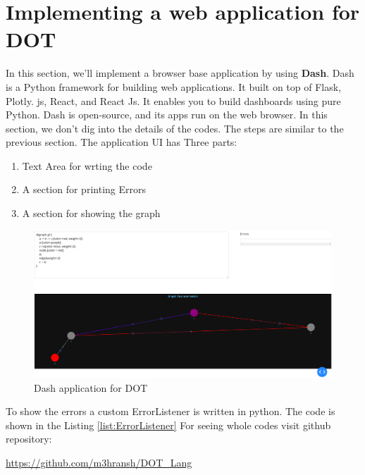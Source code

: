 \section{Implementing a web application for DOT}
In this section, we'll implement a browser base 
application by using \textbf{Dash}. Dash is a 
Python framework for building web applications. 
It built on top of Flask, Plotly. js, React, and 
React Js. It enables you to build dashboards using 
pure Python. Dash is open-source, and its apps run 
on the web browser.
In this section, we don't dig into the details of 
the codes. The steps are similar to the previous 
section. The application UI has Three parts:
\begin{enumerate}
    \item Text Area for wrting the code
    \item A section for printing Errors
    \item A section for showing the graph
\end{enumerate}

\begin{figure}[H]
\centering
\includegraphics[width=\linewidth]{images/dash-app.png}
\caption{Dash application for DOT}
\end{figure}
To show the errors a custom ErrorListener is written in python. The code is shown
in the Listing \ref{list:ErrorListener}
For seeing whole codes visit github repository:
\newline
\par \href{https://github.com/m3hransh/DOT_Lang}{https://github.com/m3hransh/DOT\_Lang}